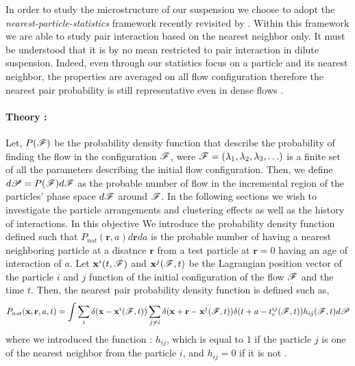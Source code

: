 
In order to study the microstructure of our suspension we choose to adopt the \textit{nearest-particle-statistics} framework recently revisited by \citet{zhang2021ensemble}.
Within this framework we are able to study pair interaction based on the nearest neighbor only. 
It must be understood that it is by no mean restricted to pair interaction in dilute suspension. 
Indeed, even through our statistics focus on a particle and its nearest neighbor, the properties are averaged on all flow configuration therefore the nearest pair probability is still representative even in dense flows \citet{zhang2021ensemble}. 



\paragraph*{Theory :}
Let, $P(\mathscr{F})$ be the probability density function that describe the probability of finding the flow in the configuration $\mathscr{F}$, were $\mathscr{F} = (\lambda_1,\lambda_2,\lambda_3,\ldots)$ is a finite set of all the parameters describing the initial flow configuration.
Then, we define $d\mathscr{P} = P(\mathscr{F})d\mathscr{F}$ as the probable number of flow in the incremental region of the particles' phase space $d\mathscr{F}$ around $\mathscr{F}$. 
In the following sections we wish to investigate the particle arrangements and clustering effects as well as the history of interactions. 
In this objective We introduce the probability density function defined such that $P_{nst}(\textbf{r},a)d\textbf{r}da$ is the probable number of having  a nearest neighboring particle at a disatnce $\textbf{r}$ from a test particle at $\textbf{r} = 0$ having an age of interaction of $a$. 
Let $\textbf{x}^i(t,\mathscr{F})$ and $\textbf{x}^j(\mathscr{F},t)$ be the Lagrangian position vector of the particle $i$ and $j$ function of the initial configuration of the flow $\mathscr{F}$ and the time $t$. 
Then, the nearest pair probability density function is defined such as, 
\begin{equation}
    P_{nst}(\textbf{x},\textbf{r},a,t)= 
    \int \sum_{i}\delta(\textbf{x}-\textbf{x}^i(\mathscr{F},t))
    \sum_{j\neq i}\delta(\textbf{x}+\textbf{r}-\textbf{x}^j(\mathscr{F},t)) 
    \delta(t+a-t_c^{ij}(\mathscr{F},t)) 
    h_{ij}(\mathscr{F},t) d\mathscr{P} 
    \label{eq:P_nstij}
\end{equation}
where we introduced the function : $h_{ij}$, which is equal to $1$ if the particle $j$ is one of the nearest neighbor from the particle $i$, and $h_{ij} = 0$ if it is not \citet{zhang2021ensemble}. 
